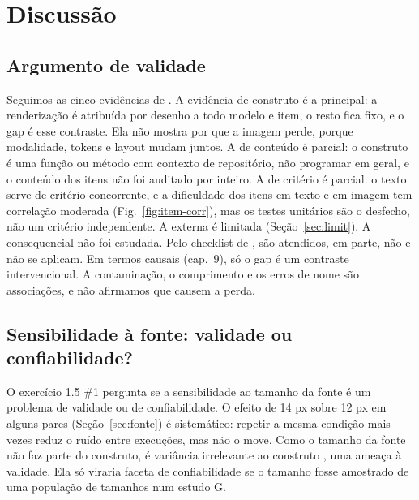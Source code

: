 \section{Discussão}

\subsection{Argumento de validade}
\label{sec:validade}
Seguimos as cinco evidências de \citealp[seç.~1.2]{truong2026measurement}. A evidência de construto é a principal: a renderização é atribuída por desenho a todo modelo e item, o resto fica fixo, e o gap é esse contraste. Ela não mostra por que a imagem perde, porque modalidade, tokens e layout mudam juntos. A de conteúdo é parcial: o construto é uma função ou método com contexto de repositório, não programar em geral, e o conteúdo dos itens não foi auditado por inteiro. A de critério é parcial: o texto serve de critério concorrente, e a dificuldade dos itens em texto e em imagem tem correlação moderada (Fig.~\ref{fig:item-corr}), mas os testes unitários são o desfecho, não um critério independente. A externa é limitada (Seção~\ref{sec:limit}). A consequencial não foi estudada. Pelo checklist de \citealp[seç.~13.5]{truong2026measurement}, \checklistYes{} são atendidos, \checklistPartly{} em parte, \checklistNo{} não e \checklistNA{} não se aplicam. Em termos causais (cap.~9), só o gap é um contraste intervencional. A contaminação, o comprimento e os erros de nome são associações, e não afirmamos que causem a perda.

\subsection{Sensibilidade à fonte: validade ou confiabilidade?}
\label{sec:disc-fonte}
O exercício 1.5 \#1 pergunta se a sensibilidade ao tamanho da fonte é um problema de validade ou de confiabilidade. O efeito de 14 px sobre 12 px em alguns pares (Seção~\ref{sec:fonte}) é sistemático: repetir a mesma condição mais vezes reduz o ruído entre execuções, mas não o move. Como o tamanho da fonte não faz parte do construto, é variância irrelevante ao construto \citep[seç.~1.3]{truong2026measurement}, uma ameaça à validade. Ela só viraria faceta de confiabilidade se o tamanho fosse amostrado de uma população de tamanhos num estudo G.

